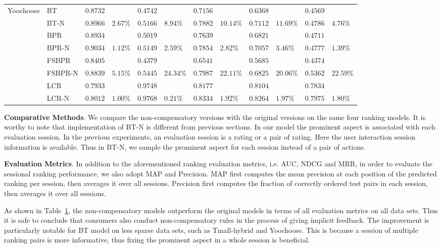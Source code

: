 \documentclass[letterpaper]{article} %
\begin{document}
\begin{table}[ht]
\begin{center}
\begin{tabular}{p{1.2cm}<{\centering}|p{1.2cm}<{\centering} |p{0.5cm} p{0.6cm} |p{0.5cm} p{0.6cm} |p{0.5cm} p{0.6cm}|p{0.5cm} p{0.6cm} |p{0.5cm} p{0.6cm}}
	\hline
\multirow{6}{*}{Yoochoose}	&BT	& $0.8732 $&  &$0.4742$& &$0.7156$&   &$0.6368$& 	& $0.4569$ 	&\\
	&BT-N	&$0.8966$ &	$2.67\%$	&$0.5166 $	&$8.94\%$	&$0.7882$ &	$10.14\%$	&$0.7112$ &	$11.69\%$	&$0.4786 $	&$4.76\%$\\
	&BPR&	$0.8934$ 	&&	$0.5019$ 	&&	$0.7639$ & &$0.6821$& 	& $0.4711$ 	&\\
	&BPR-N	&$0.9034$ 	&$1.12\%$	&$0.5149$ &	$2.59\%$	&$0.7854$ 	&$2.82\%$ &$0.7057$ &	$3.46\%$	&$0.4777 $	&$1.39\%$	\\
	&FSBPR		&$0.8405$&	&$0.4379$ 	&&	$0.6541$& &$0.5685$& 	& $0.4374$ 	&\\	
	&FSBPR-N	&$0.8839$	&$5.15\%$	&	$0.5445$ 	&$24.34\%$	&$0.7987$ 	&$22.11\%$ &$0.6825$ &	$20.06\%$	&$0.5362 $	&$22.59\%$	\\
	&LCR		&$0.7933$&	&$0.9748$ 	&&	$0.8177$& &$0.8104$& 	& $0.7834$ 	&\\	
	&LCR-N	&$0.8012$	&$1.00\%$	&	$0.9768$ 	&$0.21\%$	&$0.8334$ 	&$1.92\%$ &$0.8264$ &	$1.97\%$	&$0.7975 $	&$1.80\%$\\
	\hline
	\end{tabular}
\end{center}
\label{tab:gradedresult}
\end{table}%

\textbf{Comparative Methods}. We compare the non-compensatory versions with the original versions on the same four ranking models. It is worthy to note that implementation of BT-N is different from previous sections.  In our model the prominent aspect is associated with each evaluation session. In the previous experiments, an evaluation session is a rating or a pair of rating. Here the user interaction session information is available. Thus in BT-N, we sample the prominent aspect for each session instead of a pair of actions.  

\textbf{Evaluation Metrics}.  In addition to the aforementioned  ranking evaluation metrics, i.e. AUC, NDCG and MRR, in order to evaluate the sessional ranking performance, we also adopt  MAP and Precision. MAP first computes the mean precision at each position of the predicted ranking per session, then averages it over all sessions. Precision first computes the fraction of correctly ordered test pairs in each session, then averages it over all sessions. 

As shown in Table~\ref{tab:gradedresult}, the non-compensatory models outperform the original models in terms of all evaluation metrics on all data sets. Thus it is safe to conclude that consumers also conduct non-compensatory rules in the process of giving implicit feedback. The improvement is particularly notable for BT model on less sparse data sets, such as Tmall-hybrid and Yoochoose. This is because a session of multiple ranking pairs is more informative, thus fixing the prominent aspect in a whole session is beneficial.
\end{document}
